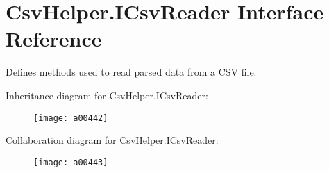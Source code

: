 \hypertarget{a00104}{\section{Csv\-Helper.\-I\-Csv\-Reader Interface Reference}
\label{a00104}
}


Defines methods used to read parsed data from a C\-S\-V file.  




Inheritance diagram for Csv\-Helper.\-I\-Csv\-Reader\-:
\nopagebreak
\begin{figure}[H]
\begin{center}
\leavevmode
\texttt{[image: a00442]}
\end{center}
\end{figure}


Collaboration diagram for Csv\-Helper.\-I\-Csv\-Reader\-:
\nopagebreak
\begin{figure}[H]
\begin{center}
\leavevmode
\texttt{[image: a00443]}
\end{center}
\end{figure}
